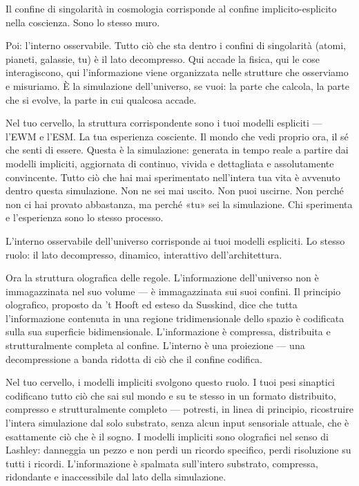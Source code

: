 \documentclass[11pt, twoside, openright]{book}
\begin{document}
Il confine di singolarità in cosmologia corrisponde al confine implicito-esplicito nella coscienza. Sono lo stesso muro.

Poi: l'interno osservabile. Tutto ciò che sta dentro i confini di singolarità (atomi, pianeti, galassie, tu) è il lato decompresso. Qui accade la fisica, qui le cose interagiscono, qui l'informazione viene organizzata nelle strutture che osserviamo e misuriamo. È la simulazione dell'universo, se vuoi: la parte che calcola, la parte che si evolve, la parte in cui qualcosa accade.

Nel tuo cervello, la struttura corrispondente sono i tuoi modelli espliciti --- l'EWM e l'ESM. La tua esperienza cosciente. Il mondo che vedi proprio ora, il sé che senti di essere. Questa è la simulazione: generata in tempo reale a partire dai modelli impliciti, aggiornata di continuo, vivida e dettagliata e assolutamente convincente. Tutto ciò che hai mai sperimentato nell'intera tua vita è avvenuto dentro questa simulazione. Non ne sei mai uscito. Non puoi uscirne. Non perché non ci hai provato abbastanza, ma perché «tu» sei la simulazione. Chi sperimenta e l'esperienza sono lo stesso processo.

L'interno osservabile dell'universo corrisponde ai tuoi modelli espliciti. Lo stesso ruolo: il lato decompresso, dinamico, interattivo dell'architettura.

Ora la struttura olografica delle regole. L'informazione dell'universo non è immagazzinata nel suo volume --- è immagazzinata sui suoi confini. Il principio olografico, proposto da 't Hooft ed esteso da Susskind, dice che tutta l'informazione contenuta in una regione tridimensionale dello spazio è codificata sulla sua superficie bidimensionale. L'informazione è compressa, distribuita e strutturalmente completa al confine. L'interno è una proiezione --- una decompressione a banda ridotta di ciò che il confine codifica.

Nel tuo cervello, i modelli impliciti svolgono questo ruolo. I tuoi pesi sinaptici codificano tutto ciò che sai sul mondo e su te stesso in un formato distribuito, compresso e strutturalmente completo --- potresti, in linea di principio, ricostruire l'intera simulazione dal solo substrato, senza alcun input sensoriale attuale, che è esattamente ciò che è il sogno. I modelli impliciti sono olografici nel senso di Lashley: danneggia un pezzo e non perdi un ricordo specifico, perdi risoluzione su tutti i ricordi. L'informazione è spalmata sull'intero substrato, compressa, ridondante e inaccessibile dal lato della simulazione.
\end{document}
